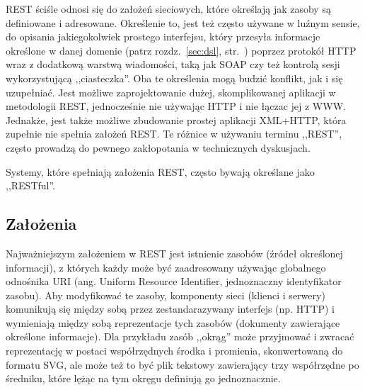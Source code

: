 \documentclass[a4paper,12pt,oneside]{report}
\begin{document}
REST ściśle odnosi się do założeń sieciowych, które określają jak zasoby są definiowane i adresowane. Określenie to, jest też często używane w luźnym sensie, do opisania jakiegokolwiek prostego interfejsu, który przesyła informacje określone w danej domenie (patrz rozdz.~\ref{sec:dsl}, str.~\pageref{sec:dsl}) poprzez protokół HTTP wraz z dodatkową warstwą wiadomości, taką jak SOAP czy też kontrolą sesji wykorzystującą ,,ciasteczka''. Oba te określenia mogą budzić konflikt, jak i się uzupełniać. Jest możliwe zaprojektowanie dużej, skomplikowanej aplikacji w metodologii REST, jednocześnie nie używając HTTP i nie łączac jej z WWW. Jednakże, jest także możliwe zbudowanie prostej aplikacji XML+HTTP, która zupełnie nie spełnia założeń REST. Te różnice w używaniu terminu ,,REST'', często prowadzą do pewnego zakłopotania w technicznych dyskusjach.

Systemy, które spełniają założenia REST, często bywają określane jako ,,RESTful''.

\subsection{Założenia}
\label{sub:rest-zalozenia}
Najważniejszym założeniem w REST jest istnienie zasobów (źródeł określonej informacji), z których każdy może być zaadresowany używając globalnego odnośnika URI (ang. Uniform Resource Identifier, jednoznaczny identyfikator zasobu). Aby modyfikować te zasoby, komponenty sieci (klienci i serwery) komunikują się między sobą przez zestandarazywany interfejs (np. HTTP) i wymieniają między sobą reprezentacje tych zasobów (dokumenty zawierające określone informacje). Dla przykładu zasób ,,okrąg'' może przyjmować i zwracać reprezentację w postaci współrzędnych środka i promienia, skonwertowaną do formatu SVG, ale może też to być plik tekstowy zawierający trzy współrzędne po średniku, które lężąc na tym okręgu definiują go jednoznacznie.
\end{document}
